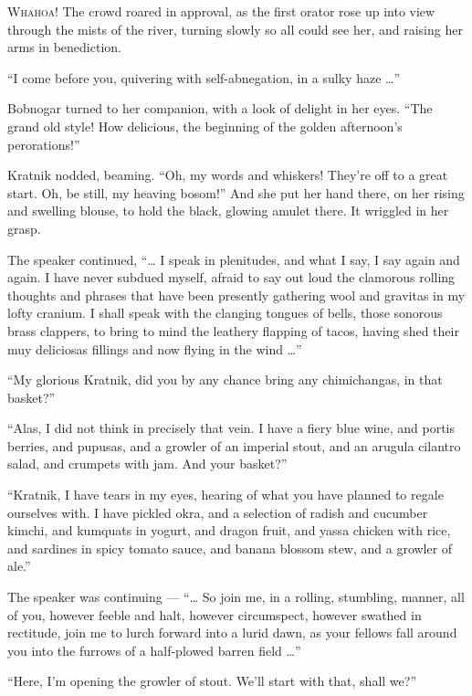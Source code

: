 
\lettrine{W}{hahoa!} The crowd roared in approval, as the first orator rose up into
view through the mists of the river, turning slowly so all could see
her, and raising her arms in benediction.

``I come before you, quivering with self-abnegation, in a sulky
haze \ldots{}''

Bobnogar turned to her companion, with a look of delight in her eyes.
``The grand old style! How delicious, the beginning of the golden
afternoon's perorations!''

Kratnik nodded, beaming. ``Oh, my words and whiskers! They're off to a
great start. Oh, be still, my heaving bosom!'' And she put her hand
there, on her rising and swelling blouse, to hold the black, glowing
amulet there. It wriggled in her grasp.

The speaker continued, ``\ldots{} I speak in plenitudes, and what I say, I
say again and again. I have never subdued myself, afraid to say out loud
the clamorous rolling thoughts and phrases that have been presently
gathering wool and gravitas in my lofty cranium. I shall speak with the
clanging tongues of bells, those sonorous brass clappers, to bring to
mind the leathery flapping of tacos, having shed their muy deliciosas
fillings and now flying in the wind \ldots{}''

``My glorious Kratnik, did you by any chance bring any chimichangas, in
that basket?''

``Alas, I did not think in precisely that vein. I have a fiery blue
wine, and portis berries, and pupusas, and a growler of an imperial
stout, and an arugula cilantro salad, and crumpets with jam. And your
basket?''

``Kratnik, I have tears in my eyes, hearing of what you have planned to
regale ourselves with. I have pickled okra, and a selection of radish
and cucumber kimchi, and kumquats in yogurt, and dragon fruit, and yassa
chicken with rice, and sardines in spicy tomato sauce, and banana
blossom stew, and a growler of ale.''

The speaker was continuing --- ``\ldots{} So join me, in a rolling, stumbling,
manner, all of you, however feeble and halt, however circumspect,
however swathed in rectitude, join me to lurch forward into a lurid
dawn, as your fellows fall around you into the furrows of a half-plowed
barren field \ldots{}''

``Here, I'm opening the growler of stout. We'll start with that, shall
we?''

